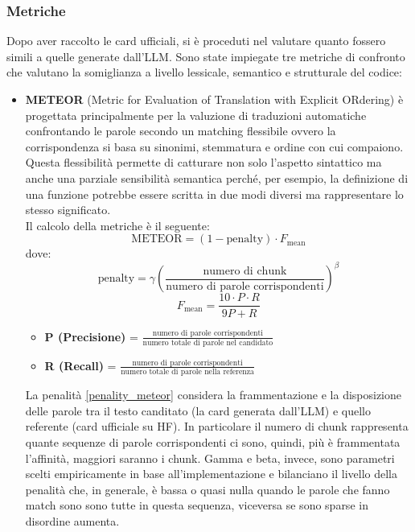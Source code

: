 \documentclass{article}
\begin{document}
\subsubsection{Metriche}
Dopo aver raccolto le card ufficiali, si è proceduti nel valutare quanto fossero simili a quelle generate dall'LLM. Sono state impiegate tre metriche di confronto che valutano la somiglianza a livello lessicale, semantico e strutturale del codice:
\begin{itemize}
    \item \textbf{METEOR} (Metric for Evaluation of Translation with Explicit ORdering) \cite{banerjee2005meteor} è progettata principalmente per la valuzione di traduzioni automatiche confrontando le parole secondo un matching flessibile ovvero la corrispondenza si basa su sinonimi, stemmatura e ordine con cui compaiono. Questa flessibilità permette di catturare non solo l'aspetto sintattico ma anche una parziale sensibilità semantica perché, per esempio, la definizione di una funzione potrebbe essere scritta in due modi diversi ma rappresentare lo stesso significato.\\
    Il calcolo della metriche è il seguente:
    \begin{equation}
        \text{METEOR} = (1 - \text{penalty}) \cdot F_{\text{mean}}
    \end{equation}
    dove:
    \begin{equation} \label{penality_meteor}
        \text{penalty} = \gamma \left( \frac{\text{numero di chunk}}{\text{numero di parole corrispondenti}} \right)^\beta
    \end{equation}
    \begin{equation} \label{media_meteor}
        F_{\text{mean}} = \frac{10 \cdot P \cdot R}{9P + R}
    \end{equation}
    \begin{itemize}
        \item \textbf{P (Precisione)} = $\frac{\text{numero di parole corrispondenti}}{\text{numero totale di parole nel candidato}}$
        \item \textbf{R (Recall)} = $\frac{\text{numero di parole corrispondenti}}{\text{numero totale di parole nella referenza}}$
    \end{itemize}
    La penalità \ref{penality_meteor} considera la frammentazione e la disposizione delle parole tra il testo canditato (la card generata dall'LLM) e quello referente (card ufficiale su HF). In particolare il numero di chunk rappresenta quante sequenze di parole corrispondenti ci sono, quindi, più è frammentata l'affinità, maggiori saranno i chunk. Gamma e beta, invece, sono parametri scelti empiricamente in base all'implementazione e bilanciano il livello della penalità che, in generale, è bassa o quasi nulla quando le parole che fanno match sono sono tutte in questa sequenza, viceversa se sono sparse in disordine aumenta.\\

\end{itemize}
\end{document}

